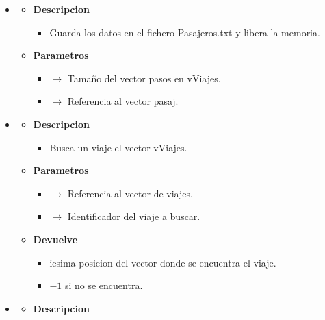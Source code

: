 \begin{itemize}
\begin{itemize}
\begin{itemize}
		\end{itemize}
	\end{itemize}
    \item {}
    \begin{itemize}
        \item \textbf{Descripcion}
        \begin{itemize}
			\item  Guarda los datos en el fichero Pasajeros.txt y libera la memoria.
		\end{itemize}
		\item \textbf{Parametros}
		\begin{itemize}
            \item {} $\rightarrow$ Tamaño del vector pasos en vViajes.
			\item {} $\rightarrow$ Referencia al vector pasaj.
		\end{itemize}
	\end{itemize}
    \item {}
    \begin{itemize}
        \item \textbf{Descripcion}
        \begin{itemize}
			\item  Busca un viaje el vector vViajes.
		\end{itemize}
		\item \textbf{Parametros}
		\begin{itemize}
			\item {} $\rightarrow$ Referencia al vector de viajes.
            \item {} $\rightarrow$ Identificador del viaje a buscar.
		\end{itemize}
        \item \textbf{Devuelve}
		\begin{itemize}
			\item iesima posicion del vector donde se encuentra el viaje.
            \item $-1$ si no se encuentra.
		\end{itemize}
	\end{itemize}
    \item {}
    \begin{itemize}
        \item \textbf{Descripcion}
        \begin{itemize}

\end{itemize}
\end{itemize}
\end{itemize}
